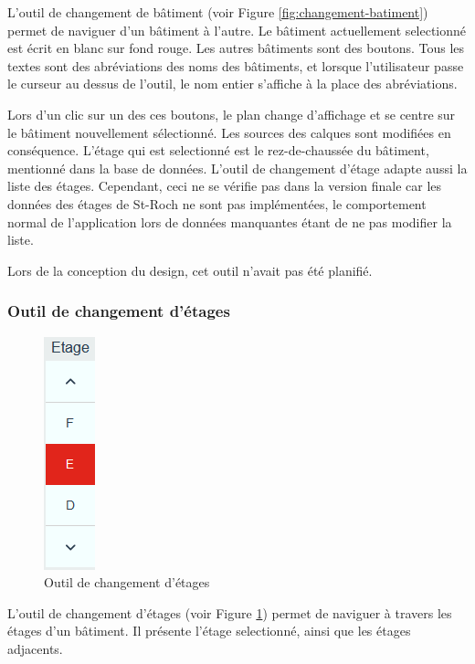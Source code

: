 \documentclass[
    iai, %
    il, %
]{heig-tb}
\begin{document}
L'outil de changement de bâtiment (voir Figure \ref{fig:changement-batiment}) permet de naviguer d'un bâtiment à l'autre.
Le bâtiment actuellement selectionné est écrit en blanc sur fond rouge. Les autres bâtiments sont des boutons.
Tous les textes  sont des abréviations des noms des bâtiments, et lorsque l'utilisateur passe le curseur au dessus de l'outil,
le nom entier s'affiche à la place des abréviations.

Lors d'un clic sur un des ces boutons, le plan change d'affichage et se centre sur le bâtiment nouvellement sélectionné.
Les sources des calques sont modifiées en conséquence.
L'étage qui est selectionné est le rez-de-chaussée du bâtiment, mentionné dans la base de données.
L'outil de changement d'étage adapte aussi la liste des étages.
Cependant, ceci ne se vérifie pas dans la version finale car les données des étages de St-Roch ne sont pas implémentées,
le comportement normal de l'application lors de données manquantes étant de ne pas modifier la liste.

Lors de la conception du design, cet outil n'avait pas été planifié.

\subsubsection{Outil de changement d'étages}

\begin{figure}[h]
    \centering
    \includegraphics[scale=0.8]{frontend-floorChange.png}
    \caption{Outil de changement d'étages}
    \label{fig:changement-étage}
\end{figure}

L'outil de changement d'étages (voir Figure \ref{fig:changement-étage}) permet de naviguer à travers les étages d'un bâtiment.
Il présente l'étage selectionné, ainsi que les étages adjacents.
\end{document}
